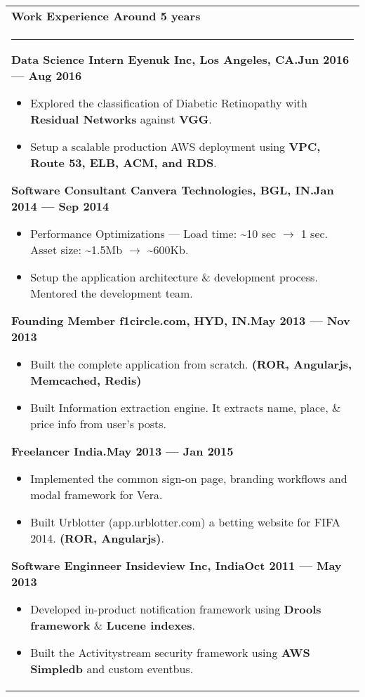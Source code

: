 \documentclass{article}
\begin{document}
\begin{tabular}{p{\dimexpr\linewidth-2\tabcolsep}}
	\bfseries \large{Work Experience} \hfill Around 5 years \\
	\noindent\rule{\textwidth}{0.4pt}
	{\bfseries Data Science Intern \hfill Eyenuk Inc, Los Angeles, CA\@.\hfill Jun 2016 --- Aug 2016}
	\begin{itemize}
		\item Explored the classification of Diabetic Retinopathy with \textbf{Residual Networks} against \textbf{VGG}.
		\item Setup a scalable production AWS deployment using \textbf{VPC, Route 53, ELB, ACM, and RDS}\@.
	\end{itemize}

	\bigskip
	{\bfseries Software Consultant \hfill Canvera Technologies, BGL, IN\@.\hfill Jan 2014 --- Sep 2014}
	\begin{itemize}
		\item Performance Optimizations --- Load time: \textasciitilde10 sec \( \rightarrow \) 1 sec. Asset size: \textasciitilde1.5Mb \( \rightarrow \) \textasciitilde600Kb.
		\item Setup the application architecture \& development process. Mentored the development team.
	\end{itemize}
	\bigskip 
	{\bfseries Founding Member \hfill f1circle.com, HYD, IN\@.\hfill May 2013 --- Nov 2013}
	\begin{itemize}
		\item Built the complete application from scratch. \textbf{(ROR, Angularjs, Memcached, Redis)}
		\item Built Information extraction engine. It extracts name, place, \& price info from user's posts.
	\end{itemize}
	\bigskip
	{\bfseries Freelancer \hfill India.\hfill May 2013 --- Jan 2015}
	\begin{itemize}
		\item Implemented the common sign-on page, branding workflows and modal framework for Vera.
		\item Built Urblotter (app.urblotter.com) a betting website for FIFA 2014. \textbf{(ROR, Angularjs)}.
	\end{itemize}
	\bigskip
	{\bfseries Software Enginneer \hfill Insideview Inc, India\hfill Oct 2011 --- May 2013}
	\begin{itemize}
		\item Developed in-product notification framework using \textbf{Drools framework} \& \textbf{Lucene indexes}.
		\item Built the Activitystream security framework using \textbf{AWS Simpledb} and custom eventbus.
	\end{itemize}
\end{tabular}
\end{document}
